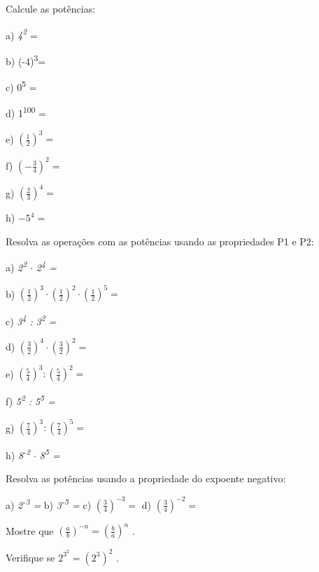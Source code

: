 \begin{exercicios}
\exitem{} Calcule as potências:

\begin{multicols}{4}
    a) \textit{4\textsuperscript{2}} =
    
    b) (-4)\textsuperscript{3}=

    c) 0\textsuperscript{5} =

    d) 1\textsuperscript{100} =

    e)  \(  \left( \frac{1}{2} \right) ^{3}= \)
    
    f)  \(  \left( -\frac{3}{4} \right) ^{2}= \)

    g)  \(  \left( \frac{2}{3} \right) ^{4}= \) 
    
    h)  \( -5^{4}= \) 
\end{multicols}

\exitem{} Resolva as operações com as potências usando as propriedades P1 e P2:

\begin{multicols}{4}
a)  \textit{2\textsuperscript{2} $ \cdot $} \textit{2\textsuperscript{4} =}

b) $\left(\frac{1}{2}\right) ^{3} \cdot  \left( \frac{1}{2} \right) ^{2} \cdot  \left( \frac{1}{2} \right) ^{5}=$

c) \textit{3\textsuperscript{4} :} \textit{3\textsuperscript{2} =}

d)  \(  \left( \frac{3}{2} \right) ^{4} \cdot  \left( \frac{3}{2} \right) ^{2}= \)

e)  \(  \left( \frac{5}{4} \right) ^{3}: \left( \frac{5}{4} \right) ^{2}= \)

f) \textit{5\textsuperscript{2} :} \textit{5\textsuperscript{5} =}

g)  \(  \left( \frac{7}{4} \right) ^{3}: \left( \frac{7}{4} \right) ^{5}= \)  

h) \textit{8\textsuperscript{-2} $ \cdot $ } \textit{8\textsuperscript{5 }=}
\end{multicols}

\exitem{} Resolva as potências usando a propriedade do expoente negativo:

a)  \textit{2\textsuperscript{-3} = } b) \textit{3\textsuperscript{-5}  =} c)  \(  \left( \frac{3}{4} \right) ^{-3}= \)   d)  \(  \left( \frac{3}{4} \right) ^{-2}= \)  

\item Mostre que  \(  \left( \frac{a}{b} \right) ^{-n}= \left( \frac{b}{a} \right) ^{n} \) .

\item Verifique se  \( 2^{3^{2}}=  \left( 2^{3} \right) ^{2} \) .


\end{exercicios}
